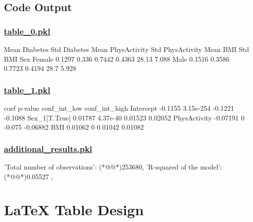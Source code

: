 \documentclass[11pt]{article}
\begin{document}
\subsection{Code Output}\hypertarget{file-table-0-pkl}{}

\subsubsection*{\hyperlink{code-Data Analysis-table-0-pkl}{table\_0.pkl}}

\begin{codeoutput}
        Mean Diabetes  Std Diabetes  Mean PhysActivity  Std PhysActivity  Mean BMI  Std BMI
Sex                                                                                        
Female         0.1297         0.336             0.7442            0.4363     28.13    7.088
Male           0.1516        0.3586             0.7723            0.4194      28.7    5.928
\end{codeoutput}\hypertarget{file-table-1-pkl}{}

\subsubsection*{\hyperlink{code-Data Analysis-table-1-pkl}{table\_1.pkl}}

\begin{codeoutput}
                  coef    p-value  conf_int_low  conf_int_high
Intercept      -0.1155  3.15e-254       -0.1221        -0.1088
Sex_1[T.True]  0.01787   4.37e-40       0.01523        0.02052
PhysActivity  -0.07191          0        -0.075       -0.06882
BMI            0.01062          0       0.01042        0.01082
\end{codeoutput}\hypertarget{file-additional-results-pkl}{}

\subsubsection*{\hyperlink{code-Data Analysis-additional-results-pkl}{additional\_results.pkl}}

\begin{codeoutput}
{
    'Total number of observations': (*@@*)253680,
    'R-squared of the model': (*@@*)0.05527            ,
}
\end{codeoutput}

\section{LaTeX Table Design}
\end{document}
